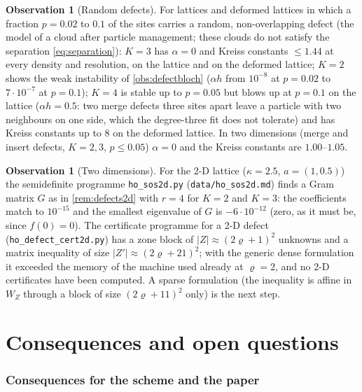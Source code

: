\documentclass[11pt,a4paper]{article}
\theoremstyle{plain}
\theoremstyle{definition}
\newtheorem{observation}[theorem]{Observation}
\theoremstyle{remark}
\numberwithin{equation}{section}
\begin{document}
\begin{observation}[Random defects]\label{obs:defectrandom}
For lattices and deformed lattices in which a fraction $p=0.02$ to $0.1$ of the sites carries a random, non-overlapping defect (the model of a cloud after particle management; these clouds do not satisfy the separation \eqref{eq:separation}): $K=3$ has $\alpha=0$ and Kreiss constants $\le1.44$ at every density and resolution, on the lattice and on the deformed lattice; $K=2$ shows the weak instability of \cref{obs:defectbloch} ($\alpha h$ from $10^{-8}$ at $p=0.02$ to $7\cdot10^{-7}$ at $p=0.1$); $K=4$ is stable up to $p=0.05$ but blows up at $p=0.1$ on the lattice ($\alpha h=0.5$: two merge defects three sites apart leave a particle with two neighbours on one side, which the degree-three fit does not tolerate) and has Kreiss constants up to $8$ on the deformed lattice. In two dimensions (merge and insert defects, $K=2,3$, $p\le0.05$) $\alpha=0$ and the Kreiss constants are $1.00$--$1.05$.
\end{observation}

\begin{observation}[Two dimensions]\label{obs:sos2d}
For the 2-D lattice ($\kappa=2.5$, $a=(1,0.5)$) the semidefinite programme \texttt{ho\_sos2d.py} (\texttt{data/ho\_sos2d.md}) finds a Gram matrix $G$ as in \cref{rem:defects2d} with $r=4$ for $K=2$ and $K=3$: the coefficients match to $10^{-15}$ and the smallest eigenvalue of $G$ is $-6\cdot10^{-12}$ (zero, as it must be, since $f(0)=0$). The certificate programme for a 2-D defect (\texttt{ho\_defect\_cert2d.py}) has a zone block of $|Z|\approx(2\varrho+1)^2$ unknowns and a matrix inequality of size $|Z'|\approx(2\varrho+21)^2$; with the generic dense formulation it exceeded the memory of the machine used already at $\varrho=2$, and no 2-D certificates have been computed. A sparse formulation (the inequality is affine in $W_Z$ through a block of size $(2\varrho+11)^2$ only) is the next step.
\end{observation}

\part{Consequences and open questions}

\section{Consequences for the scheme and the paper}\label{sec:consequences}
\end{document}
